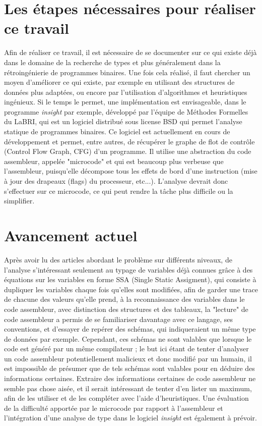 \documentclass[a4paper,12pt]{article}
\begin{document}
\section{Les étapes nécessaires pour réaliser ce travail}

Afin de réaliser ce travail, il est nécessaire de se documenter sur ce qui
existe déjà dans le domaine de la recherche de types et plus généralement
dans la rétroingénierie de programmes binaires. Une fois cela réalisé,
il faut chercher un moyen d'améliorer ce qui existe, par exemple en
utilisant des structures de données plus adaptées, ou encore par
l'utilisation d'algorithmes et heuristiques ingénieux. Si le temps le permet,
une implémentation est envisageable, dans le programme \textit{insight} par 
exemple, développé par l'équipe de Méthodes Formelles du LaBRI, qui est
un logiciel distribué sous license BSD qui permet l'analyse statique de
programmes binaires. Ce logiciel est actuellement en cours de développement
et permet, entre autres, de récupérer le graphe de flot de contrôle
(Control Flow Graph, CFG) d'un programme. Il utilise une abstraction du code
assembleur, appelée "microcode" et qui est beaucoup plus verbeuse que
l'assembleur, puisqu'elle décompose tous les effets de bord d'une instruction
(mise à jour des drapeaux (flags) du processeur, etc...). L'analyse
devrait donc s'effectuer sur ce microcode, ce qui peut rendre la tâche
plus difficile ou la simplifier. 


\section{Avancement actuel}

Après avoir lu des articles abordant le problème sur différents niveaux,
de l'analyse s'intéressant seulement au typage de variables déjà connues
grâce à des équations sur les variables en forme SSA (Single Static 
Assigment), qui consiste à dupliquer les variables chaque fois qu'elles
sont modifiées, afin de garder une trace de chacune des valeurs qu'elle
prend, à la reconnaissance des variables dans le code assembleur, avec
distinction des structures et des tableaux, la "lecture" de code assembleur
a permis de se familiariser davantage avec ce langage, ses conventions,
et d'essayer de repérer des schémas, qui indiqueraient un même type 
de données par exemple. Cependant, ces schémas ne sont valables que lorsque
le code est généré par un même compilateur ; le but ici étant de tenter
d'analyser un code assembleur potentiellement malicieux et donc modifié
par un humain, il est impossible de présumer que de tels schémas sont
valables pour en déduire des informations certaines. Extraire des
informations certaines de code assembleur ne semble pas chose aisée, et il
serait intéressant de tenter d'en lister un maximum, afin de les utiliser
et de les compléter avec l'aide d'heuristiques. Une évaluation de la
difficulté apportée par le microcode par rapport à l'assembleur et 
l'intégration d'une analyse de type dans le logiciel \textit{insight} est
également à prévoir.
\end{document}
